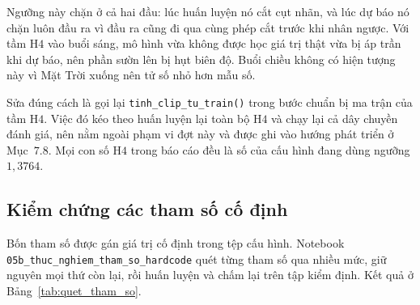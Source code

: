 \documentclass[12pt, a4paper]{report}
\begin{document}
Ngưỡng này chặn ở cả hai đầu: lúc huấn luyện nó cắt cụt nhãn, và lúc dự báo nó chặn luôn đầu
ra vì đầu ra cũng đi qua cùng phép cắt trước khi nhân ngược. Với tầm H$4$ vào buổi sáng, mô
hình vừa không được học giá trị thật vừa bị áp trần khi dự báo, nên phần sườn lên bị hụt biên
độ. Buổi chiều không có hiện tượng này vì Mặt Trời xuống nên tử số nhỏ hơn mẫu số.

Sửa đúng cách là gọi lại \texttt{tinh\_clip\_tu\_train()} trong bước chuẩn bị ma trận của tầm H$4$.
Việc đó kéo theo huấn luyện lại toàn bộ H$4$ và chạy lại cả dây chuyền đánh giá, nên nằm ngoài
phạm vi đợt này và được ghi vào hướng phát triển ở Mục~$7.8$. Mọi con số H$4$ trong báo cáo đều
là số của cấu hình đang dùng ngưỡng $1{,}3764$.

\FloatBarrier
\subsection{Kiểm chứng các tham số cố định}

Bốn tham số được gán giá trị cố định trong tệp cấu hình. Notebook
\texttt{05b\_thuc\_nghiem\_tham\_so\_hardcode} quét từng tham số qua nhiều mức, giữ nguyên mọi thứ
còn lại, rồi huấn luyện và chấm lại trên tập kiểm định. Kết quả ở Bảng~\ref{tab:quet_tham_so}.
\end{document}
